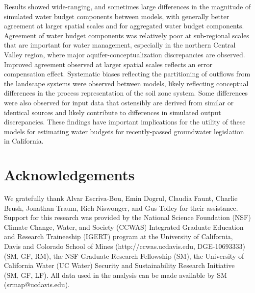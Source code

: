 Results showed wide-ranging, and sometimes large differences in the magnitude of simulated water budget components between models, with generally better agreement at larger spatial scales and for aggregated water budget components. Agreement of water budget components was relatively poor at sub-regional scales that are important for water management, especially in the northern Central Valley region, where major aquifer-conceptualization discrepancies are observed. Improved agreement observed at larger spatial scales reflects an error compensation effect. Systematic biases reflecting the partitioning of outflows from the landscape systems were observed between models, likely reflecting conceptual differences in the process representation of the soil zone system. Some differences were also observed for input data that ostensibly are derived from similar or identical sources and likely contribute to differences in simulated output discrepancies. These findings have important implications for the utility of these models for estimating water budgets for recently-passed groundwater legislation in California.

\section{Acknowledgements}
We gratefully thank Alvar Escriva-Bou, Emin Dogrul, Claudia Faunt, Charlie Brush, Jonathan Traum, Rich Niswonger, and Gus Tolley for their assistance. Support for this research was provided by the National Science Foundation (NSF) Climate Change, Water, and Society (CCWAS) Integrated Graduate Education and Research Traineeship (IGERT) program at the University of California, Davis and Colorado School of Mines (http://ccwas.ucdavis.edu, DGE-10693333) (SM, GF, RM), the NSF Graduate Research Fellowship (SM), the University of California Water (UC Water) Security and Sustainability Research Initiative (SM, GF, LF). All data used in the analysis can be made available by SM (srmap@ucdavis.edu).